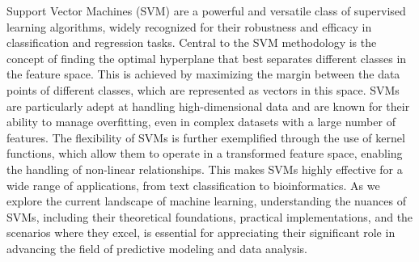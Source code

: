 \documentclass[../../../main.tex]{subfiles}
\begin{document}
Support Vector Machines (SVM) are a powerful and versatile class of supervised learning algorithms, widely recognized for their robustness and efficacy in classification and regression tasks. Central to the SVM methodology is the concept of finding the optimal hyperplane that best separates different classes in the feature space. This is achieved by maximizing the margin between the data points of different classes, which are represented as vectors in this space. SVMs are particularly adept at handling high-dimensional data and are known for their ability to manage overfitting, even in complex datasets with a large number of features. The flexibility of SVMs is further exemplified through the use of kernel functions, which allow them to operate in a transformed feature space, enabling the handling of non-linear relationships. This makes SVMs highly effective for a wide range of applications, from text classification to bioinformatics. As we explore the current landscape of machine learning, understanding the nuances of SVMs, including their theoretical foundations, practical implementations, and the scenarios where they excel, is essential for appreciating their significant role in advancing the field of predictive modeling and data analysis.
\end{document}

